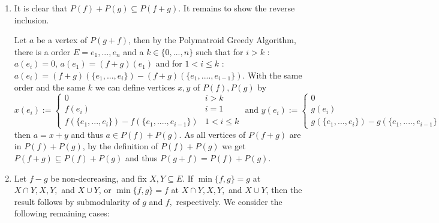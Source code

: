 \documentclass{article}
\begin{document}
  \begin{enumerate}[label=(\roman*)]
      \item It is clear that $P(f)+P(g)\subseteq P(f+g).$ It remains to show the reverse inclusion.

      Let $a$ be a vertex of $P(g+f)$, then by the Polymatroid Greedy Algorithm, there is a order $E={e_1,...,e_n}$ and a $k\in \{0,...,n\}$ such that for $i>k$ : $a(e_i)=0$, $a(e_1)=(f+g)(e_1)$ and  for $1<i\leq k$ :  $a(e_i)=(f+g)(\{e_1,...,e_i\})-(f+g)(\{e_1,....,e_{i-1}\})$. With the same order and the same $k$ we can define vertices $x,y$ of $P(f), P(g)$  by
      $$x(e_i):=\begin{cases}
              0 & i>k\\
              f(e_i) &i=1\\
              f(\{e_1,...,e_i\})-f(\{e_1,....,e_{i-1}\})& 1<i\leq k
        \end{cases}
        \text{ and }
       y(e_i):=\begin{cases}
              0 & i>k\\
              g(e_i) &i=1\\
              g(\{e_1,...,e_i\})-g(\{e_1,....,e_{i-1}\})& 1<i\leq k
        \end{cases}$$
      then $a=x+y$ and thus $a\in P(f)+P(g)$. As all vertices of $P(f+g)$ are in $P(f)+P(g)$, by the definition of $P(f)+P(g)$ we get $P(f+g)\subseteq P(f)+P(g)$ and thus $P(g+f) = P(f) + P(g)$.


      \item Let $f-g$ be non-decreasing, and fix $X,Y\subseteq E.$ If $\min\{f,g\}=g$ at $X\cap Y,X,Y,$ and $X\cup Y$, or $\min\{f,g\}=f$ at $X\cap Y,X,Y,$ and $X\cup Y$, then the result follows by submodularity of $g$ and $f,$ respectively. We consider the following remaining cases:

      \begin{enumerate}[label=Case \arabic*:]


\end{enumerate}
\end{enumerate}
\end{document}
